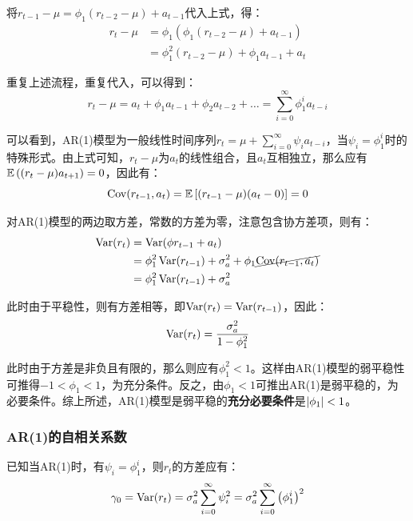 \documentclass[11pt]{article}
\begin{document}
将$r_{t-1} - \mu = \phi_1 (r_{t-2}-\mu)+ a_{t-1}$代入上式，得：
\begin{align*}
    r_t - \mu &= \phi_1 \left(\phi_1 (r_{t-2}-\mu)+ a_{t-1} \right) \\
    &= \phi_1^2 (r_{t-2}-\mu)+ \phi_1 a_{t-1} + a_t
\end{align*}

重复上述流程，重复代入，可以得到：
\begin{equation*}
    r_t - \mu = a_t + \phi_1 a_{t-1} + \phi_2 a_{t-2} + \dots = \sum_{i=0}^{\infty} \phi_{1}^{i} a_{t-i}
\end{equation*}

可以看到，AR(1)模型为一般线性时间序列$r_t = \mu + \sum_{i=0}^{\infty} \psi_i a_{t-i}$，当$\psi_i = \phi_{1}^{i}$时的特殊形式。由上式可知，$r_t-\mu$为$a_t$的线性组合，且$a_t$互相独立，那么应有$\mathbb{E}\left((r_{t}-\mu)a_{t+1}\right)=0$，因此有：
\begin{equation*}
    \operatorname{Cov}(r_{t-1},a_t) = \mathbb{E}\left[(r_{t-1} - \mu)(a_{t} - 0) \right] = 0
\end{equation*}

对AR(1)模型的两边取方差，常数的方差为零，注意包含协方差项，则有：
\begin{align*}
    \operatorname{Var}(r_t) &= \operatorname{Var}(\phi r_{t-1} + a_t) \\
    &= \phi_{1}^{2} \operatorname{Var}(r_{t-1}) + \sigma_{a}^{2} + \phi_1 \cancel{\operatorname{Cov} (r_{t-1},a_t)} \\
    &= \phi_{1}^{2} \operatorname{Var}(r_{t-1}) + \sigma_{a}^{2}
\end{align*}

此时由于平稳性，则有方差相等，即$\operatorname{Var}(r_{t}) = \operatorname{Var}(r_{t-1})$，因此：
\begin{equation*}
    \operatorname{Var}(r_{t}) = \frac{\sigma_{a}^{2}}{1-\phi_{1}^{2}}
\end{equation*}

此时由于方差是非负且有限的，那么则应有$\phi_{1}^{2}<1$。这样由AR(1)模型的弱平稳性可推得$-1<\phi_1<1$，为充分条件。反之，由$\phi_1<1$可推出AR(1)是弱平稳的，为必要条件。综上所述，AR(1)模型是弱平稳的\textbf{充分必要条件}是$\left\lvert \phi_1\right\rvert<1$。

\subsubsection*{AR(1)的自相关系数}

已知当AR(1)时，有$\psi_i = \phi_1^i$，则$r_t$的方差应有：
\begin{equation*}
    \gamma_0 = \operatorname{Var}(r_t) = \sigma_{a}^{2}\sum_{i=0}^{\infty} \psi_{i}^{2}
    = \sigma_{a}^{2}\sum_{i=0}^{\infty} \left( \phi_1^{i}\right)^{2}
\end{equation*}
\end{document}
